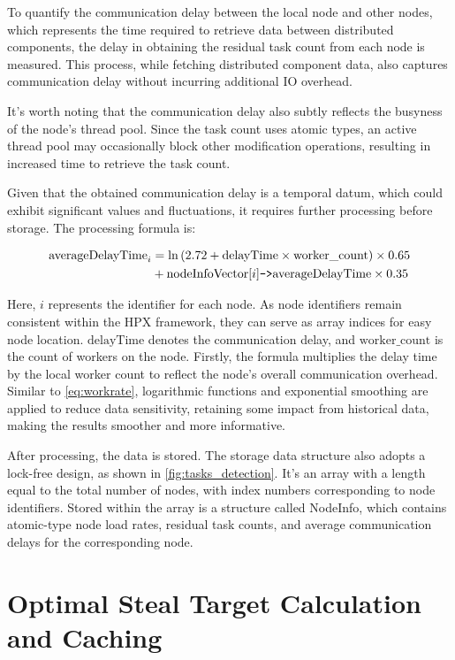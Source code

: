 \documentclass{mproj}
\begin{document}
To quantify the communication delay between the local node and other nodes,
which represents the time required to retrieve data between distributed components,
the delay in obtaining the residual task count from each node is measured.
This process, while fetching distributed component data,
also captures communication delay without incurring additional IO overhead.

It's worth noting that the communication delay also subtly reflects the busyness of the node's thread pool.
Since the task count uses atomic types,
an active thread pool may occasionally block other modification operations,
resulting in increased time to retrieve the task count.

Given that the obtained communication delay is a temporal datum,
which could exhibit significant values and fluctuations, it requires further processing before storage.
The processing formula is:

\begin{align}
    \text{averageDelayTime}_i & = \ln\left(2.72 + \text{delayTime} \times \text{worker\_count}\right) \times 0.65 \notag               \\
                              & + \text{nodeInfoVector}[i]\texttt{->}\text{averageDelayTime} \times 0.35   \label{eq:averageDelayTime}
\end{align}

Here, $i$ represents the identifier for each node.
As node identifiers remain consistent within the HPX framework,
they can serve as array indices for easy node location.
$\text{delayTime}$ denotes the communication delay, and $\text{worker\_count}$ is the count of workers on the node.
Firstly, the formula multiplies the delay time by the local worker count to reflect the node's overall communication overhead.
Similar to \cref{eq:workrate}, logarithmic functions and exponential smoothing are applied to reduce data sensitivity,
retaining some impact from historical data,
making the results smoother and more informative.

After processing, the data is stored.
The storage data structure also adopts a lock-free design,
as shown in \cref{fig:tasks_detection}.
It's an array with a length equal to the total number of nodes,
with index numbers corresponding to node identifiers.
Stored within the array is a structure called NodeInfo,
which contains atomic-type node load rates, residual task counts, and average communication delays for the corresponding node.

\section{Optimal Steal Target Calculation and Caching}
\end{document}
